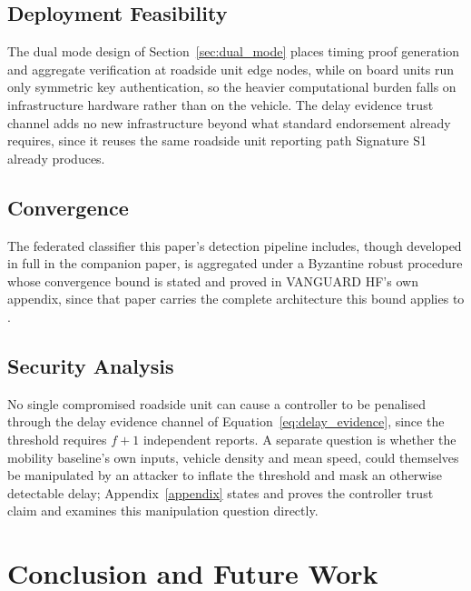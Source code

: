 \documentclass[final,5p,twocolumn]{elsarticle}
\theoremstyle{remark}
\theoremstyle{plain}
\begin{document}
\subsection{Deployment Feasibility}
The dual mode design of Section~\ref{sec:dual_mode} places timing proof
generation and aggregate verification at roadside unit edge nodes, while on
board units run only symmetric key authentication, so the heavier
computational burden falls on infrastructure hardware rather than on the
vehicle. The delay evidence trust channel adds no new infrastructure beyond
what standard endorsement already requires, since it reuses the same
roadside unit reporting path Signature S1 already produces.

\subsection{Convergence}
The federated classifier this paper's detection pipeline includes, though
developed in full in the companion paper, is aggregated under a Byzantine
robust procedure whose convergence bound is stated and proved in
VANGUARD HF's own appendix, since that paper carries the complete
architecture this bound applies to \cite{VanguardHF2026}.

\subsection{Security Analysis}
No single compromised roadside unit can cause a controller to be penalised
through the delay evidence channel of Equation~\eqref{eq:delay_evidence},
since the threshold requires $f{+}1$ independent reports. A separate
question is whether the mobility baseline's own inputs, vehicle density and
mean speed, could themselves be manipulated by an attacker to inflate the
threshold and mask an otherwise detectable delay; Appendix~\ref{appendix}
states and proves the controller trust claim and examines this
manipulation question directly.


\section{Conclusion and Future Work}
\end{document}
